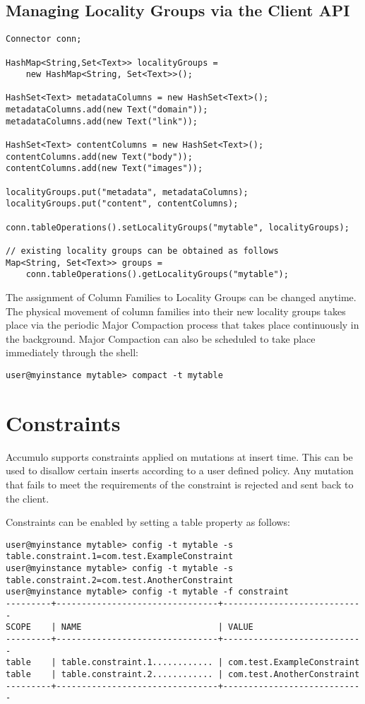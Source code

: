 \subsection{Managing Locality Groups via the Client API}

\small
\begin{verbatim}
Connector conn;

HashMap<String,Set<Text>> localityGroups =
    new HashMap<String, Set<Text>>();

HashSet<Text> metadataColumns = new HashSet<Text>();
metadataColumns.add(new Text("domain"));
metadataColumns.add(new Text("link"));

HashSet<Text> contentColumns = new HashSet<Text>();
contentColumns.add(new Text("body"));
contentColumns.add(new Text("images"));

localityGroups.put("metadata", metadataColumns);
localityGroups.put("content", contentColumns);

conn.tableOperations().setLocalityGroups("mytable", localityGroups);

// existing locality groups can be obtained as follows
Map<String, Set<Text>> groups =
    conn.tableOperations().getLocalityGroups("mytable");
\end{verbatim}
\normalsize

The assignment of Column Families to Locality Groups can be changed anytime. The
physical movement of column families into their new locality groups takes place via
the periodic Major Compaction process that takes place continuously in the
background. Major Compaction can also be scheduled to take place immediately
through the shell:

\small
\begin{verbatim}
user@myinstance mytable> compact -t mytable
\end{verbatim}
\normalsize

\section{Constraints}

Accumulo supports constraints applied on mutations at insert time. This can be
used to disallow certain inserts according to a user defined policy. Any mutation
that fails to meet the requirements of the constraint is rejected and sent back to the
client.

Constraints can be enabled by setting a table property as follows:

\small
\begin{verbatim}
user@myinstance mytable> config -t mytable -s table.constraint.1=com.test.ExampleConstraint
user@myinstance mytable> config -t mytable -s table.constraint.2=com.test.AnotherConstraint
user@myinstance mytable> config -t mytable -f constraint
---------+--------------------------------+----------------------------
SCOPE    | NAME                           | VALUE
---------+--------------------------------+----------------------------
table    | table.constraint.1............ | com.test.ExampleConstraint
table    | table.constraint.2............ | com.test.AnotherConstraint
---------+--------------------------------+----------------------------
\end{verbatim}
\normalsize

